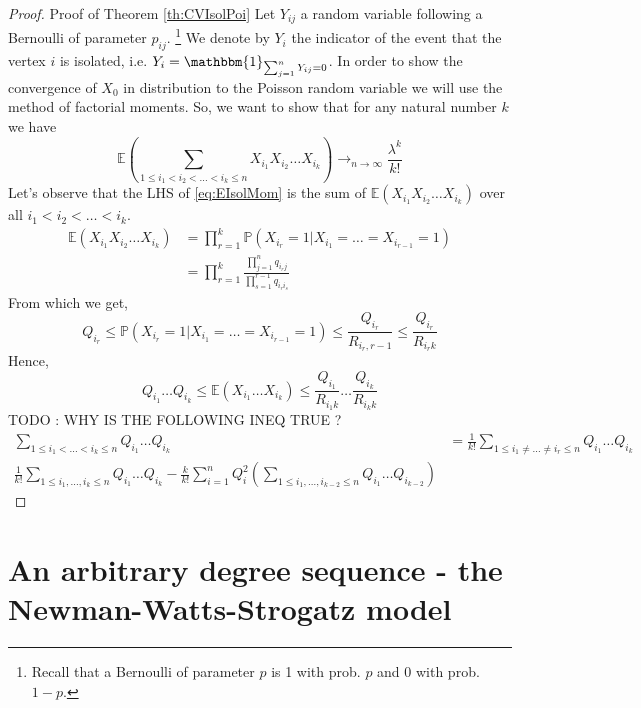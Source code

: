 \begin{proof}{Proof of Theorem \ref{th:CVIsolPoi}}
	Let $Y_{ij}$ a random variable following a Bernoulli of parameter $p_{ij}$.
	\footnote{ Recall that a Bernoulli of parameter $p$ is 1 with prob. $p$ and 0 with prob. $1-p$.}
	We denote by $Y_i$ the indicator of the event that the vertex $i$ is isolated, i.e. $Y_i = \mathbbm{1}_{\sum_{j=1}^n Y_{ij} = 0}$.
	In order to show the convergence of $X_0$ in distribution to the Poisson random variable we will use the method of factorial moments.
	So, we want to show that for any natural number $k$ we have
	\begin{equation}\label{eq:EIsolMom}
		\mathbb{E}(\sum_{1\leq i_1<i_2< \ldots < i_k \leq n} X_{i_1}X_{i_2}\ldots X_{i_k}) \to_{n \to \infty} \frac{\lambda^k}{k!}
	\end{equation}
	Let's observe that the LHS of \eqref{eq:EIsolMom} is the sum of $\mathbb{E}(X_{i_1}X_{i_2}\ldots X_{i_k})$ over all $i_1 < i_2 < \ldots <i_k$.
	\begin{align}
		\mathbb{E}(X_{i_1}X_{i_2}\ldots X_{i_k}) 	&= \prod_{r=1}^k \mathbb{P}(X_{i_r} = 1 | X_{i_1} = \ldots = X_{i_{r-1}} = 1) \\
							&= \prod_{r=1}^k\frac{ \prod_{j=1}^n q_{i_r j} }{ \prod_{s=1}^{r-1}q_{i_r i_s}}
	\end{align}
	From which we get,
	\begin{equation}
		Q_{i_r} \leq \mathbb{P}(X_{i_r} = 1 | X_{i_1} = \ldots = X_{i_{r-1}} = 1) \leq \frac{Q_{i_r}}{R_{i_r, r-1}} \leq \frac{Q_{i_r}}{R_{i_r k}} 
	\end{equation}
	Hence,
	\begin{equation}
		Q_{i_1} \ldots Q_{i_k} \leq \mathbb{E}(X_{i_1}\ldots X_{i_k}) \leq \frac{Q_{i_1}}{R_{i_1 k}} \ldots \frac{Q_{i_k}}{R_{i_k k}}
	\end{equation}
	TODO : WHY IS THE FOLLOWING INEQ TRUE ?
	\begin{align}
		\sum_{1\leq i_1 < \ldots < i_k \leq n} Q_{i_1} \ldots Q_{i_k} &= \frac{1}{k!}\sum_{1 \leq i_1 \neq \ldots \neq i_r \leq n} Q_{i_1} \ldots Q_{i_k} \\
			\frac{1}{k!} \sum_{1\leq i_1, \ldots, i_k \leq n} Q_{i_1}\ldots Q_{i_k} 
			- \frac{k}{k!}\sum_{i=1}^n Q_i^2(\sum_{1 \leq i_1, \ldots, i_{k-2} \leq n} Q_{i_1} \ldots Q_{i_{k-2}})
	\end{align}
\end{proof}
\section{An arbitrary degree sequence - the Newman-Watts-Strogatz model}
